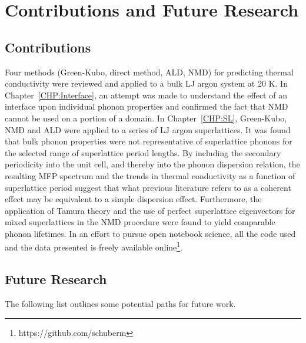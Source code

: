 \chapter{Contributions and Future Research}

\section{Contributions}

Four methods (Green-Kubo, direct method, ALD, NMD) for predicting thermal conductivity were reviewed and applied to a bulk LJ argon system at 20 K. In Chapter~\ref{CHP:Interface}, an attempt was made to understand the effect of an interface upon individual phonon properties and confirmed the fact that NMD cannot be used on a portion of a domain. In Chapter~\ref{CHP:SL}, Green-Kubo, NMD and ALD were applied to a series of LJ argon superlattices. It was found that bulk phonon properties were not representative of superlattice phonons for the selected range of superlattice period lengths. By including the secondary periodicity into the unit cell, and thereby into the phonon dispersion relation, the resulting MFP spectrum and the trends in thermal conductivity as a function of superlattice period suggest that what previous literature refers to as a coherent effect may be equivalent to a simple dispersion effect. Furthermore, the application of Tamura theory and the use of perfect superlattice eigenvectors for mixed superlattices in the NMD procedure were found to yield comparable phonon lifetimes. In an effort to pursue open notebook science, all the code used and the data presented is freely available online\footnote{https://github.com/schuberm}.

\section{Future Research}

The following list outlines some potential paths for future work.

